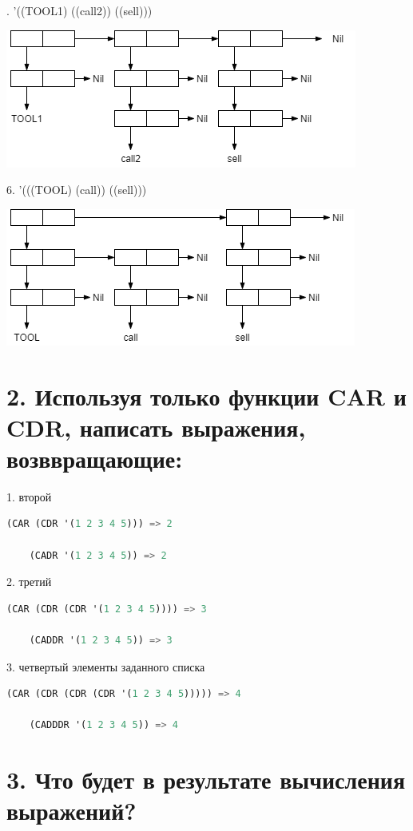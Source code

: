 \documentclass[12pt]{report}
\begin{document}
. '((TOOL1) ((call2)) ((sell)))

\includegraphics[scale=1]{img/1.5}

6. '(((TOOL) (call)) ((sell)))

\includegraphics[scale=1]{img/1.6}


\section*{2. Используя только функции CAR и CDR, написать выражения, возввращающие:}

1. второй

\begin{lstlisting}[language=Lisp]
	(CAR (CDR '(1 2 3 4 5))) => 2
	
	(CADR '(1 2 3 4 5)) => 2
\end{lstlisting}

2. третий

\begin{lstlisting}[language=Lisp]
	(CAR (CDR (CDR '(1 2 3 4 5)))) => 3
	
	(CADDR '(1 2 3 4 5)) => 3
\end{lstlisting}

3. четвертый элементы заданного списка

\begin{lstlisting}[language=Lisp]
	(CAR (CDR (CDR (CDR '(1 2 3 4 5))))) => 4
	
	(CADDDR '(1 2 3 4 5)) => 4
\end{lstlisting}

\section*{3. Что будет в результате вычисления выражений?}
\end{document}
